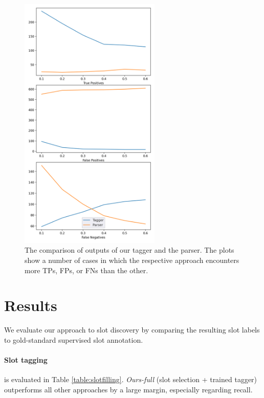 \begin{figure}
    \centering
    \includegraphics[width=0.6\textwidth]{images/slots.png}
    \caption{The comparison of outputs of our tagger and the parser. The plots show a number of cases in which the respective approach encounters more TPs, FPs, or FNs than the other.}
    \label{fig:tagger_comp}
\end{figure}

\section{Results}
We evaluate our approach to slot discovery by comparing the resulting slot labels to gold-standard supervised slot annotation.

\paragraph{Slot tagging}\hspace{-3mm} is evaluated in Table \ref{table:slotfilling}.
\emph{Ours-full} (slot selection + trained tagger) outperforms all other approaches by a large margin, especially regarding recall.

